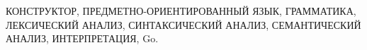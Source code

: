 КОНСТРУКТОР,
ПРЕДМЕТНО-ОРИЕНТИРОВАННЫЙ ЯЗЫК,
ГРАММАТИКА,
ЛЕКСИЧЕСКИЙ АНАЛИЗ,
СИНТАКСИЧЕСКИЙ АНАЛИЗ,
СЕМАНТИЧЕСКИЙ АНАЛИЗ,
ИНТЕРПРЕТАЦИЯ,
Go.
